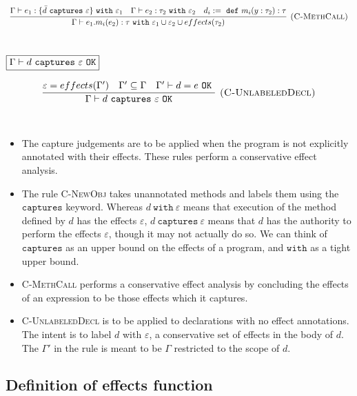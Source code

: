 \documentclass{llncs}
\newcommand{\keywadj}[1]{\mathtt{#1}}
\newcommand{\keyw}[1]{\keywadj{#1}~}
\begin{document}
\fbox{$\Gamma \vdash e_1.m(e_2) : \tau~\keyw{with} \varepsilon$}

\[
\begin{array}{c}
\infer[\textsc{(C-MethCall)}]
	{\Gamma \vdash e_1.m_i(e_2) : \tau~ \keyw{with} \varepsilon_1 \cup \varepsilon_2 \cup effects(\tau_2)}
	{\Gamma \vdash e_1 : \{ \bar d~\keyw{captures} \varepsilon \}~\keyw{with} \varepsilon_1 & \Gamma \vdash e_2:\tau_2~\keyw{with} \varepsilon_2&d_i :=~\keyw{def} m_i(y:\tau_2):\tau } \\[5ex]
\end{array}
\]

$\fbox{$\Gamma \vdash d~\keyw{captures} \varepsilon~\keywadj{OK}$}$

\[
\begin{array}{c}
\infer[\textsc{(C-UnlabeledDecl)}]
	{\Gamma \vdash d~\keyw{captures} \varepsilon~\keywadj{OK}}
	{\varepsilon = effects(\Gamma') & \Gamma' \subseteq \Gamma &  \Gamma' \vdash d = e~\keyw{OK} } \\[5ex]
\end{array}
\]

\begin{itemize}
	\item The capture judgements are to be applied when the program is not explicitly annotated with their effects. These rules perform a conservative effect analysis.
	\item The rule \textsc{C-NewObj} takes unannotated methods and labels them using the $\keywadj{captures}$ keyword. Whereas $d~\keyw{with} \varepsilon$ means that execution of the method defined by $d$ has the effects $\varepsilon$, $d~\keyw{captures} \varepsilon$ means that $d$ has the authority to perform the effects $\varepsilon$, though it may not actually do so. We can think of $\keywadj{captures}$ as an upper bound on the effects of a program, and $\keywadj{with}$ as a tight upper bound.
	\item \textsc{C-MethCall} performs a conservative effect analysis by concluding the effects of an expression to be those effects which it captures.
	\item \textsc{C-UnlabeledDecl} is to be applied to declarations with no effect annotations. The intent is to label $d$ with $\varepsilon$, a conservative set of effects in the body of $d$. The $\Gamma'$ in the rule is meant to be $\Gamma$ restricted to the scope of $d$.
\end{itemize}

\subsection{Definition of effects function}
\end{document}
